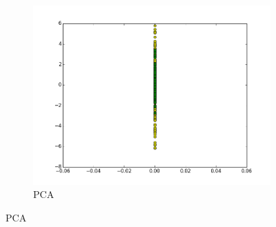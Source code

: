 \documentclass[a4paper,12pt]{article}    %
\begin{document}
\begin{figure}[!ht]
\begin{subfigure}{.45\textwidth}
		\includegraphics[width=\linewidth]{img/12pca.png}
		\caption{PCA}
	\end{subfigure}
	\label{dataset4}
\end{figure}
\vfill
\clearpage
\end{document}
